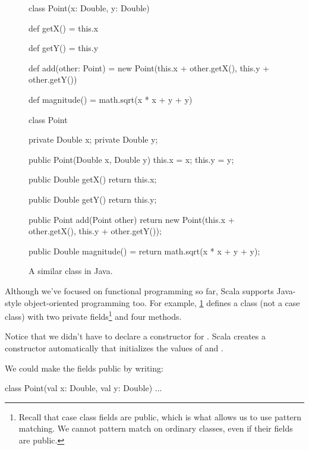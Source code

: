 \documentclass{book}
\begin{document}
\begin{figure}
\begin{minipage}{0.45\textwidth}
\begin{scalacode}
class Point(x: Double, y: Double) {

  def getX() = this.x

  def getY() = this.y

  def add(other: Point) = {
    new Point(this.x + other.getX(),
              this.y + other.getY())
  }

  def magnitude() = math.sqrt(x * x + y + y)
}
\end{scalacode}
\caption{A class for points.}\label{pointclass}
\end{minipage}
\quad\vrule\quad
\begin{minipage}{0.45\textwidth}
\begin{javacode}
class Point {
  private Double x;
  private Double y;

  public Point(Double x, Double y) {
    this.x = x;
    this.y = y;
  }

  public Double getX() {
    return this.x;
  }

  public Double getY() {
    return this.y;
  }

  public Point add(Point other) {
    return new Point(this.x + other.getX(),
                     this.y + other.getY());
  }

  public Double magnitude() = {
    return math.sqrt(x * x + y + y);
  }
}
\end{javacode}
\caption{A similar class in Java.}
\end{minipage}
\end{figure}

Although we've focused on functional programming so far, Scala supports
Java-style object-oriented programming too. For example, \cref{pointclass}
defines a  class (not a case class) with two private
fields\footnote{Recall that case class fields are public, which
is what allows us to use pattern matching. We cannot pattern match on ordinary classes,
even if their fields are public.} and four methods.

Notice that we didn't have to declare a constructor for .
Scala creates a constructor automatically that initializes the values of
 and .

We could make the fields public by writing:
\begin{scalacode}
class Point(val x: Double, val y: Double) { ... }
\end{scalacode}
\end{document}
